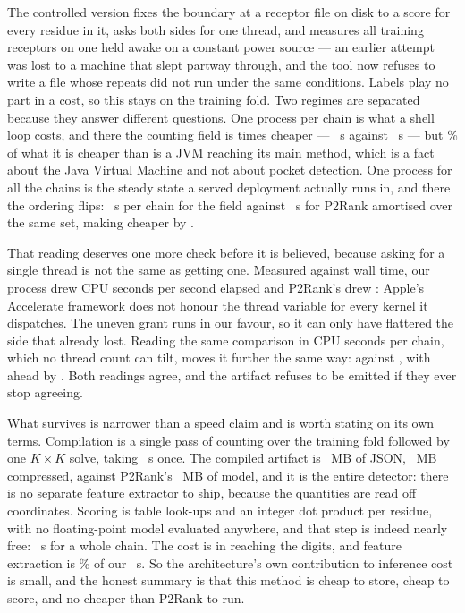 \documentclass[11pt]{article}
\begin{document}
The controlled version fixes the boundary at a receptor file on disk to a score
for every residue in it, asks both sides for one thread, and measures all
\FairChains{} training receptors on one \FairMachine{} held awake on a constant
power source --- an earlier attempt was lost to a machine that slept partway
through, and the tool now refuses to write a file whose repeats did not run under
the same conditions. Labels play no part in a
cost, so this stays on the training fold. Two regimes are separated because they
answer different questions. One process per chain is what a shell loop costs, and
there the counting field is \FairColdRatio{} times cheaper --- \FairColdOurs{}~s
against \FairColdPTwo{}~s --- but \FairJVMPct{}\% of what it is cheaper than is a
JVM reaching its main method, which is a fact about the Java Virtual Machine and
not about pocket detection. One process for all the chains is the steady state a
served deployment actually runs in, and there the ordering flips: \FairWarmOurs{}~s
per chain for the field against \FairWarmPTwo{}~s for P2Rank amortised over the
same set, making \FairWarmWinner{} cheaper by \FairWarmRatio{}.

That reading deserves one more check before it is believed, because asking for a
single thread is not the same as getting one. Measured against wall time, our
process drew \FairParOurs{} CPU seconds per second elapsed and P2Rank's drew
\FairParPTwo{}: Apple's Accelerate framework does not honour the thread variable
for every kernel it dispatches. The uneven grant runs in our favour, so it can
only have flattered the side that already lost. Reading the same comparison in CPU
seconds per chain, which no thread count can tilt, moves it further the same way:
\FairCpuOurs{} against \FairCpuPTwo{}, with \FairCpuWinner{} ahead by
\FairCpuRatio{}. Both readings agree, and the artifact refuses to be emitted if
they ever stop agreeing.

What survives is narrower than a speed claim and is worth stating on its own
terms. Compilation is a single pass of counting over the training fold followed by
one \(K \times K\) solve, taking \TabCompileSeconds{}~s once. The compiled
artifact is \FairModelOurs{}~MB of JSON, \FairModelOursGz{}~MB compressed, against
P2Rank's \FairModelPTwo{}~MB of model, and it is the entire detector: there is no
separate feature extractor to ship, because the quantities are read off
coordinates. Scoring is \NTabTables{} table look-ups and an integer dot product
per residue, with no floating-point model evaluated anywhere, and that step is
indeed nearly free: \FairScoring{}~s for a whole chain. The cost is in reaching
the digits, and feature extraction is \FairFeatPct{}\% of our
\FairWarmOurs{}~s. So the
architecture's own contribution to inference cost is small, and the honest summary
is that this method is cheap to store, cheap to score, and no cheaper than P2Rank
to run.
\end{document}
